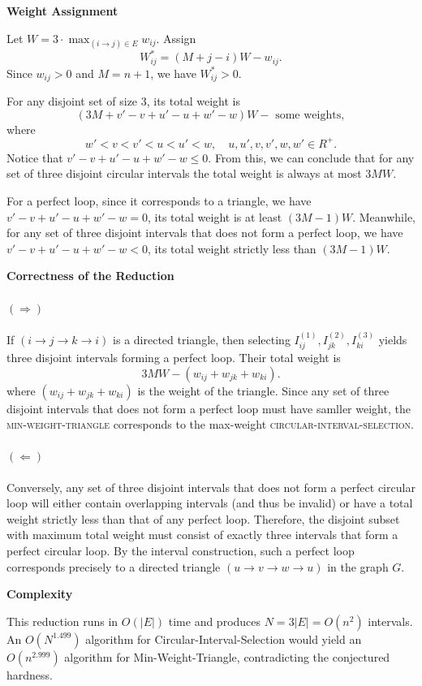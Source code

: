 \documentclass[11pt]{article}
\begin{document}
\begin{description}
\textbf{Weight Assignment}

Let $W=3\cdot \max_{(i\to j)\in E}w_{ij}$. Assign
\[
  W_{ij}^{*} = (M + j - i)W - w_{ij}.
\]
Since $w_{ij} > 0$ and $M = n + 1$, we have $W_{ij}^* > 0$.

For any disjoint set of size 3, its total weight is
\[
  (3M + v' - v + u' - u + w' - w)W - \text{ some weights},
\]
where
\[
  w' < v < v' < u < u' < w, \quad u, u', v, v', w, w' \in R^+.
\]
Notice that $v' - v + u' - u + w' - w \le 0$. From this, we can conclude that for any set of three disjoint circular intervals the total weight is always at most \(3MW\). 

For a perfect loop, since it corresponds to a triangle, we have $v' - v + u' - u + w' - w =0$, its total weight is at least \((3M-1)W\). 
Meanwhile, for any set of three disjoint intervals that does not form a perfect loop, we have $v' - v + u' - u + w' - w < 0$, its total weight strictly less than \((3M-1)W\).

\textbf{Correctness of the Reduction}

\paragraph{$(\Rightarrow)$}
If $(i \to j \to k \to i)$ is a directed triangle, then selecting $I_{ij}^{(1)},I_{jk}^{(2)},I_{ki}^{(3)}$ yields three disjoint intervals forming a perfect loop. Their total weight is
\[
  3MW - (w_{ij} + w_{jk} + w_{ki}).
\]
where $(w_{ij} + w_{jk} + w_{ki})$ is the weight of the triangle. Since any set of three disjoint intervals that does not form a perfect loop must have samller weight, the \textsc{min-weight-triangle} corresponds to the max-weight \textsc{circular-interval-selection}.

\paragraph{$(\Leftarrow)$}
Conversely, any set of three disjoint intervals that does not form a perfect circular loop will either contain overlapping intervals (and thus be invalid) or have a total weight strictly less than that of any perfect loop. Therefore, the disjoint subset with maximum total weight must consist of exactly three intervals that form a perfect circular loop. By the interval construction, such a perfect loop corresponds precisely to a directed triangle \((u \to v \to w \to u)\) in the graph \(G\).

\textbf{Complexity}

This reduction runs in $O(|E|)$ time and produces $N=3|E|=O(n^2)$ intervals.  An $O(N^{1.499})$ algorithm for {\sc Circular-Interval-Selection} would yield an $O(n^{2.999})$ algorithm for {\sc Min-Weight-Triangle}, contradicting the conjectured hardness.

\end{description}
\end{document}

